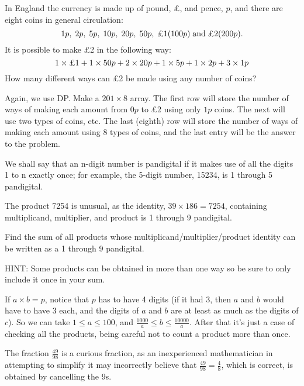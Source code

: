 In England the currency is made up of pound, \pounds, and pence, $p$, and there are eight coins in general circulation:
$$    1p,\; 2p,\; 5p, \;10p,\; 20p,\; 50p,\; \hbox{\pounds}1 (100p)\;\hbox{and}\;\hbox{\pounds2} (200p).$$
It is possible to make \pounds2 in the following way:
$$    1\times\hbox{\pounds1} + 1\times50p + 2\times20p + 1\times5p + 1\times2p + 3\times1p$$
How many different ways can \pounds2 be made using any number of coins?

Again, we use DP.  Make a $201\times8$ array.  The first row will store the number of ways of making 
each amount from $0p$ to \pounds2 using only $1p$ coins.  The next will use two types of coins, etc.
The last (eighth) row will store the number of ways of making each amount using 8 types of coins,
and the last entry will be the answer to the problem.




We shall say that an n-digit number is pandigital if it makes use of all the digits 1 to n exactly once; for example, the 5-digit number, 15234, is 1 through 5 pandigital.

The product 7254 is unusual, as the identity, $39 \times 186 = 7254$, containing multiplicand, multiplier, and product is 1 through 9 pandigital.

Find the sum of all products whose multiplicand/multiplier/product identity can be written as a 1 through 9 pandigital.

\footnotesize
HINT: Some products can be obtained in more than one way so be sure to only include it once in your sum.
\normalsize

If $a\times b = p$, notice that $p$ has to have 4 digits (if it had 3, then $a$ and $b$ would have to have 3 each, and the digits of $a$ and $b$ are at least as much as the digits of $c$).  So we can take $1 \leq a \leq 100$, and $\tfrac{1000}{a} \leq b \leq \tfrac{10000}a$.  After that it's just a case of checking all the products, being careful not to count
a product more than once. 




The fraction $\frac{49}{98}$ is a curious fraction, as an inexperienced mathematician in attempting to simplify it may incorrectly believe that $\tfrac{49}{98} = \tfrac 48$, which is correct, is obtained by cancelling the 9s.


